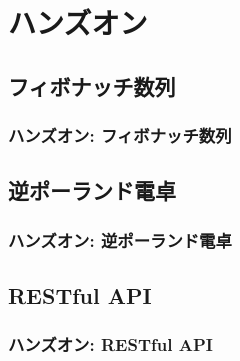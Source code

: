 \documentclass[aspectratio=169]{beamer}
\begin{document}
\section{ハンズオン}
\subsection{フィボナッチ数列}
\begin{frame}\frametitle{ハンズオン: フィボナッチ数列}
\end{frame}

\subsection{逆ポーランド電卓}
\begin{frame}\frametitle{ハンズオン: 逆ポーランド電卓}
\end{frame}

\subsection{RESTful API}
\begin{frame}\frametitle{ハンズオン: RESTful API}
\end{frame}
\end{document}
